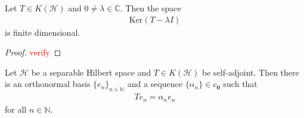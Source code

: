 \begin{lemma}
  Let $T \in K(\mathcal{H})$ and $0 \neq \lambda \in \mathbb{C}$.
  Then the space
  \begin{align*}
    \textrm{Ker}(T - \lambda I)
  \end{align*}
  is finite dimensional.
\end{lemma}
\begin{proof}
  \textcolor{red}{verify}
\end{proof}

\begin{theorem}
  \label{SpectralTheoremforCompactSAOperators}
  Let $\mathcal{H}$ be a separable Hilbert space and $T \in K(\mathcal{H})$ be
  self-adjoint. Then there is an orthonormal basis $ \{ e_n \}_{n \in
  \mathbb{N}}$ and a sequence $\{\alpha_n\} \in c_{\textbf{0}}$ such that
  \begin{align*}
    T e_n = \alpha_n e_n
  \end{align*}
  for all $n \in \mathbb{N}$.
\end{theorem}
